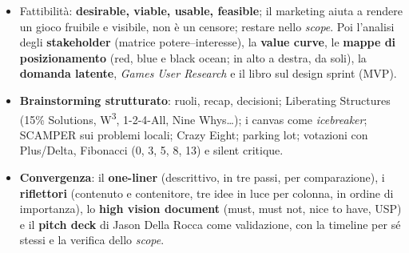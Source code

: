 \begin{itemize}
        ciclo arturiano) è inseguire una tendenza senza chiedersi se esisterà ancora
        all'uscita.
  \item Fattibilità: \textbf{desirable, viable, usable, feasible}; il marketing aiuta a
        rendere un gioco fruibile e visibile, non è un censore; restare nello
        \emph{scope}. Poi l'analisi degli \textbf{stakeholder} (matrice potere--interesse),
        la \textbf{value curve}, le \textbf{mappe di posizionamento} (red, blue e black
        ocean; in alto a destra, da soli), la \textbf{domanda latente}, \emph{Games User
        Research} e il libro sul design sprint (MVP).
  \item \textbf{Brainstorming strutturato}: ruoli, recap, decisioni; Liberating Structures
        (15\% Solutions, W\textsuperscript{3}, 1-2-4-All, Nine Whys\ldots); i canvas come
        \emph{icebreaker}; SCAMPER sui problemi locali; Crazy Eight; parking lot;
        votazioni con Plus/Delta, Fibonacci (0, 3, 5, 8, 13) e silent critique.
  \item \textbf{Convergenza}: il \textbf{one-liner} (descrittivo, in tre passi, per
        comparazione), i \textbf{riflettori} (contenuto e contenitore, tre idee in luce per
        colonna, in ordine di importanza), lo \textbf{high vision document} (must, must
        not, nice to have, USP) e il \textbf{pitch deck} di Jason Della Rocca come
        validazione, con la timeline per sé stessi e la verifica dello \emph{scope}.
\end{itemize}
